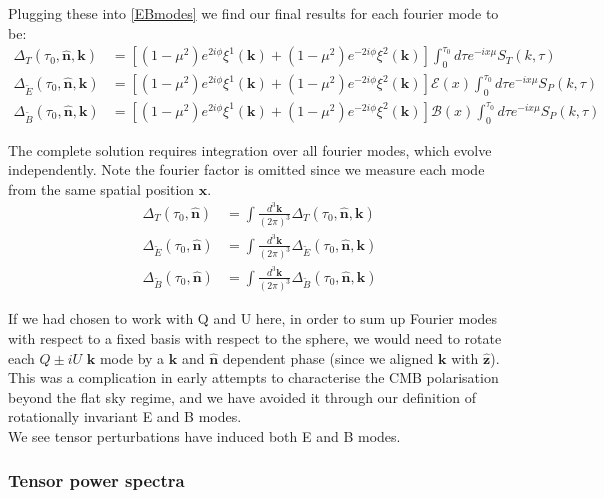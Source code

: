 \documentclass[a4paper,10pt]{article}
\renewcommand{\v}[1]{\mathbf{#1}}
\newcommand{\fint}[1]{\int \frac{d^3 \v{#1}}{(2\pi)^3}}
\newcommand{\unit}[1]{\hat{\v{#1}}}
\begin{document}
Plugging these into \ref{EBmodes} we find our final results for each fourier mode to be:
\begin{equation}\begin{split}
\Delta_T(\tau_0,\unit{n},\v{k}) &= [(1-\mu^2) e^{2i\phi} \xi^1(\v{k})+(1-\mu^2) e^{-2i\phi} \xi^2(\v{k})]\int_0^{\tau_0}d\tau e^{-ix\mu}S_T(k,\tau)\\
\Delta_{\tilde{E}}(\tau_0,\unit{n},\v{k}) &= [(1-\mu^2) e^{2i\phi} \xi^1(\v{k})+(1-\mu^2) e^{-2i\phi} \xi^2(\v{k})]\mathcal{E}(x)\int_0^{\tau_0}d\tau e^{-ix\mu}S_P(k,\tau)\\
\Delta_{\tilde{B}}(\tau_0,\unit{n},\v{k}) &= [(1-\mu^2) e^{2i\phi} \xi^1(\v{k})+(1-\mu^2) e^{-2i\phi} \xi^2(\v{k})]\mathcal{B}(x)\int_0^{\tau_0}d\tau e^{-ix\mu}S_P(k,\tau)
\label{LoSfourier}
\end{split}\end{equation}

The complete solution requires integration over all fourier modes, which evolve independently. Note the fourier factor is omitted since we measure each mode from the same spatial position $\v{x}$.
\begin{equation}\begin{split}
\Delta_T(\tau_0,\unit{n}) &= \fint{k} \Delta_T(\tau_0,\unit{n},\v{k})\\
\Delta_{\tilde{E}}(\tau_0,\unit{n}) &= \fint{k}\Delta_{\tilde{E}}(\tau_0,\unit{n},\v{k})\\
\Delta_{\tilde{B}}(\tau_0,\unit{n}) &= \fint{k}\Delta_{\tilde{B}}(\tau_0,\unit{n},\v{k})
\end{split}\end{equation}

If we had chosen to work with Q and U here, in order to sum up Fourier modes with respect to a fixed basis with respect to the sphere, we would need to rotate each $Q\pm iU$ $\v{k}$ mode by a $\v{k}$ and $\unit{n}$ dependent phase (since we aligned $\v{k}$ with $\unit{z}$). This was a complication in early attempts to characterise the CMB polarisation beyond the flat sky regime, and we have avoided it through our definition of rotationally invariant E and B modes.\\

We see tensor perturbations have induced both E and B modes.

\subsubsection{Tensor power spectra}
\end{document}
